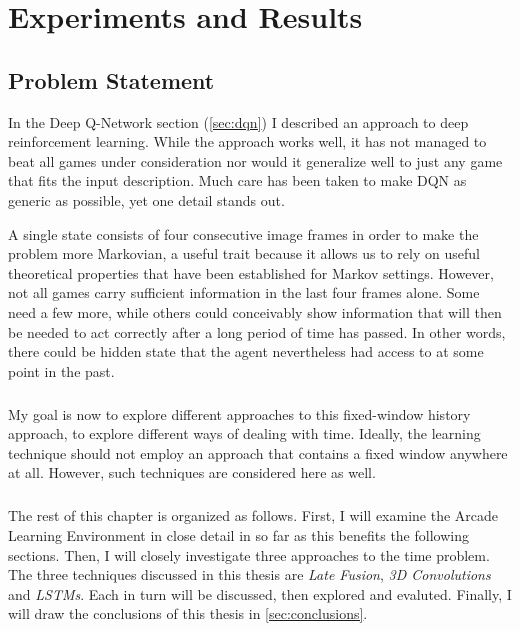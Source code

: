 \chapter{Experiments and Results}
\label{chap:experiments}

\section{Problem Statement}
\label{sec:problem_statement}

In the Deep Q-Network section (\ref{sec:dqn})
I described an approach to deep reinforcement learning.
While the approach works well,
it has not managed to beat all games under consideration
nor would it generalize well to just any game
that fits the input description.
Much care has been taken to make DQN as generic as possible,
yet one detail stands out.

A single state consists of four consecutive image frames
in order to make the problem more Markovian,
a useful trait because it allows us to rely on
useful theoretical properties that have been established
for Markov settings.
However, not all games carry sufficient information
in the last four frames alone.
Some need a few more,
while others could conceivably
show information
that will then be needed to act correctly
after a long period of time has passed.
In other words, there could be hidden state
that the agent nevertheless had access to
at some point in the past.

\paragraph{}
My goal is now to explore different approaches
to this fixed-window history approach,
to explore different ways of dealing with time.
Ideally,
the learning technique should not employ an approach
that contains a fixed window anywhere at all.
However, such techniques are considered here as well.

\paragraph{}
The rest of this chapter is organized as follows.
First, I will examine the Arcade Learning Environment
in close detail in so far as this benefits
the following sections.
Then, I will closely investigate three approaches
to the time problem.
The three techniques discussed in this thesis are
\textit{Late Fusion},
\textit{3D Convolutions}
and \textit{LSTMs}.
Each in turn will be discussed,
then explored and evaluted.
Finally,
I will draw the conclusions of this thesis
in \ref{sec:conclusions}.


